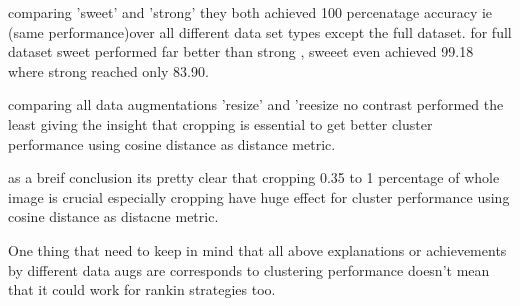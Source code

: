comparing 'sweet' and 'strong' they both achieved 100 percenatage accuracy ie (same performance)over all different data set types except the full dataset.
for full dataset sweet performed far better than strong , sweeet even achieved 99.18 where strong reached only 83.90.

comparing all data augmentations 'resize' and 'reesize no contrast performed the least giving the insight that cropping is essential to get better cluster performance
 using cosine distance as distance metric.

 as a breif conclusion its pretty clear that cropping 0.35 to 1 percentage of whole image is crucial especially cropping have huge effect for cluster performance using cosine distance as distacne metric.

 One thing that need to keep in mind that all above explanations or achievements by different data augs are corresponds to clustering performance doesn't mean that
  it could work for rankin strategies too.
    
  \begin{table}[H]
    \centering
    \caption{Evaluation Results on Different Datasets and Augmentations with euclidean distance}
    \label{tab:evaluation_results_euclidean}
\end{table}

